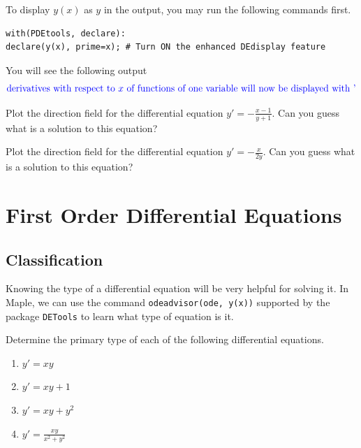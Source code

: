 \documentclass[
  12pt]{elegantbook}
\begin{document}
To display \(y(x)\) as \(y\) in the output, you may run the following commands first.

\begin{verbatim}
with(PDEtools, declare):
declare(y(x), prime=x); # Turn ON the enhanced DEdisplay feature
\end{verbatim}

You will see the following output
\[
{\color{blue}
\text{derivatives with respect to } x \text{ of functions of one variable will now be displayed with '}
}
\]

\begin{exercise}
Plot the direction field for the differential equation \(y'=-\frac{x-1}{y+1}\). Can you guess what is a solution to this equation?
\end{exercise}

\begin{exercise}
Plot the direction field for the differential equation \(y'=-\frac{x}{2y}\). Can you guess what is a solution to this equation?
\end{exercise}

\hypertarget{first-order-differential-equations}{%
\chapter{First Order Differential Equations}\label{first-order-differential-equations}}

\hypertarget{classification}{%
\section{Classification}\label{classification}}

Knowing the type of a differential equation will be very helpful for solving it. In Maple, we can use the command \texttt{odeadvisor(ode,\ y(x))} supported by the package \texttt{DETools} to learn what type of equation is it.

\begin{example}

Determine the primary type of each of the following differential equations.

\begin{enumerate}
\def\labelenumi{\arabic{enumi}.}
\item
  \(y'=xy\)
\item
  \(y'=xy+1\)
\item
  \(y'=xy+y^2\)
\item
  \(y'=\frac{xy}{x^2+y^2}\)
\end{enumerate}

\end{example}
\end{document}
